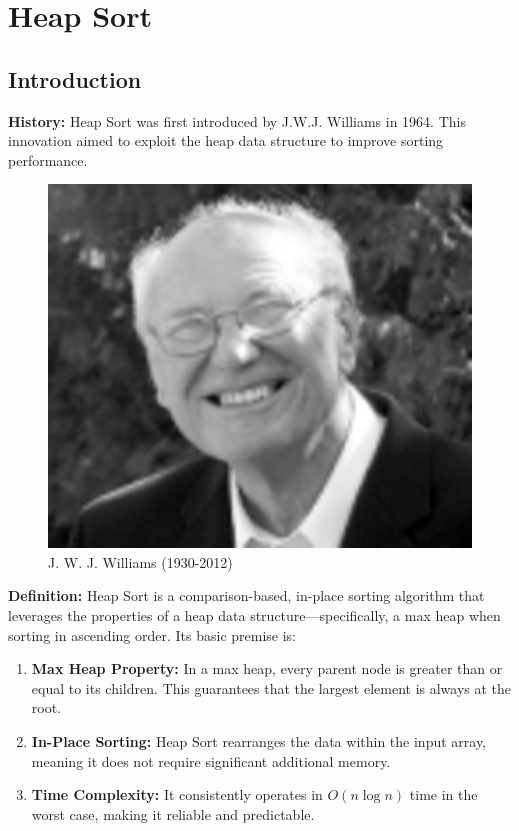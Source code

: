 \section{Heap Sort}

\subsection{Introduction}
\textbf{History:} Heap Sort was first introduced by J.W.J. Williams in 1964. This innovation aimed to exploit the heap data structure to improve sorting performance.

\begin{figure}[H]
\centering
\includegraphics[scale=.3]{img/jwjWilliams.jpg}
\caption{J. W. J. Williams (1930-2012)}
\label{fig:jwj_williams}
\end{figure}

\textbf{Definition:} Heap Sort is a comparison-based, in-place sorting algorithm that leverages the properties of a heap data structure—specifically, a max heap when sorting in ascending order. Its basic premise is:
\begin{enumerate}
    \item \textbf{Max Heap Property:} In a max heap, every parent node is greater than or equal to its children. This guarantees that the largest element is always at the root.
    \item \textbf{In-Place Sorting:} Heap Sort rearranges the data within the input array, meaning it does not require significant additional memory.
    \item \textbf{Time Complexity:} It consistently operates in $O(n \log n)$ time in the worst case, making it reliable and predictable.
\end{enumerate}

